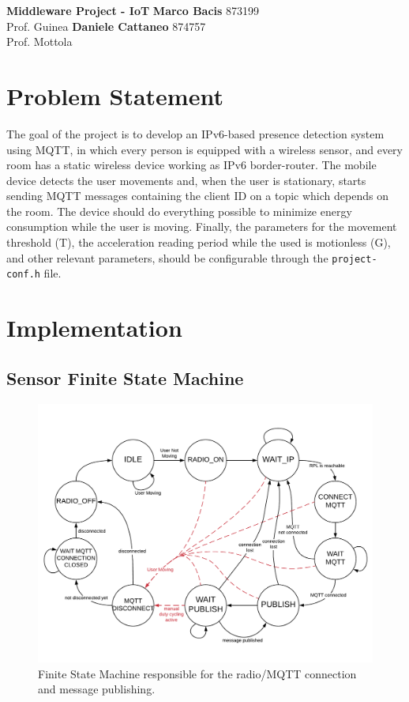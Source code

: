\documentclass[a4paper, 10pt]{article}
\begin{document}
\noindent
\large\textbf{Middleware Project - IoT} \hfill \textbf{Marco Bacis} 873199 \\
Prof. Guinea \hfill \textbf{Daniele Cattaneo} 874757 \\
Prof. Mottola

\section*{Problem Statement}

The goal of the project is to develop an IPv6-based presence detection system using MQTT, in which every person is equipped with a wireless sensor, and every room has a static wireless device working as IPv6 border-router.
The mobile device detects the user movements and, when the user is stationary, starts sending MQTT messages containing the client ID on a topic which depends on the room.
The device should do everything possible to minimize energy consumption while the user is moving.
Finally, the parameters for the movement threshold (T), the acceleration reading period while the used is motionless (G), and other relevant parameters, should be configurable through the \texttt{project-conf.h} file.

\section*{Implementation}

\subsection*{Sensor Finite State Machine}

\begin{figure}[h]
\centering
    \includegraphics[width=\linewidth]{images/fsm.pdf}
    \caption{Finite State Machine responsible for the radio/MQTT connection and message publishing.}
    \label{fig:sensor_fsm}
\end{figure}
\end{document}
